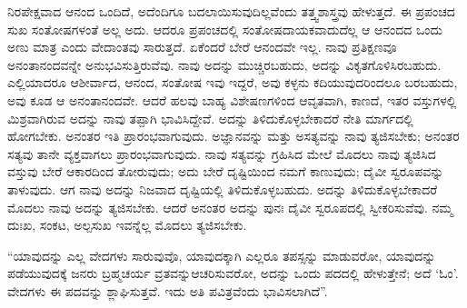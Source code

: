 \vskip 0.2cm 

ನಿರಪೇಕ್ಷವಾದ ಆನಂದ ಒಂದಿದೆ, ಅದೆಂದಿಗೂ ಬದಲಾಯಿಸುವುದಿಲ್ಲವೆಂದು ತತ್ತ್ವಶಾಸ್ತ್ರವು ಹೇಳುತ್ತದೆ. ಈ ಪ್ರಪಂಚದ ಸುಖ ಸಂತೋಷಗಳಂತೆ ಅಲ್ಲ ಅದು. ಆದರೂ ಪ್ರಪಂಚದಲ್ಲಿ ಸಂತೋಷದಾಯಕವಾದುದೆಲ್ಲ ಆ ಆನಂದದ ಒಂದು ಅಣು ಮಾತ್ರ ಎಂದು ವೇದಾಂತವು ಸಾರುತ್ತದೆ. ಏಕೆಂದರೆ ಬೇರೆ ಆನಂದವೇ ಇಲ್ಲ. ನಾವು ಪ್ರತಿಕ್ಷಣವೂ ಅನಂತಾನಂದವನ್ನೇ ಅನುಭವಿಸುತ್ತಿರುವೆವು. ನಾವು ಅದನ್ನು ಮುಚ್ಚಿರಬಹುದು, ಅದನ್ನು ವಿಕೃತಗೊಳಿಸಿರಬಹುದು. ಎಲ್ಲಿಯಾದರೂ ಆಶೀರ್ವಾದ, ಆನಂದ, ಸಂತೋಷ ಇವು ಇದ್ದರೆ, ಅವು ಕಳ್ಳನು ಕದಿಯುವುದರಿಂದಲೂ ಬರಬಹುದು, ಅವು ಕೂಡ ಆ ಅನಂತಾನಂದವೇ. ಆದರೆ ಹಲವು ಬಾಹ್ಯ ವಿಶೇಷಣಗಳಿಂದ ಆವೃತವಾಗಿ, ಕಾಣದೆ, ಇತರ ವಸ್ತುಗಳಲ್ಲಿ ಮಿಶ್ರವಾಗಿರುವ ಅದನ್ನು ನಾವು ತಪ್ಪಾಗಿ ಭಾವಿಸಿದ್ದೇವೆ. ಅದನ್ನು ತಿಳಿದುಕೊಳ್ಳಬೇಕಾದರೆ ನೇತಿ ಮಾರ್ಗದಲ್ಲಿ ಹೋಗಬೇಕು. ಅನಂತರ ಇತಿ ಪ್ರಾರಂಭವಾಗುವುದು. ಅಜ್ಞಾನವನ್ನು ಮತ್ತು ಅಸತ್ಯವನ್ನು ನಾವು ತ್ಯಜಿಸಬೇಕು; ಅನಂತರ ಸತ್ಯವು ತಾನೇ ವ್ಯಕ್ತವಾಗಲು ಪ್ರಾರಂಭವಾಗುವುದು. ನಾವು ಸತ್ಯವನ್ನು ಗ್ರಹಿಸಿದ ಮೇಲೆ ಮೊದಲು ನಾವು ತ್ಯಜಿಸಿದ ವಸ್ತುವು ಬೇರೆ ಆಕಾರದಿಂದ ತೋರುವುದು; ಅದು ಬೇರೆ ದೃಷ್ಟಿಯಿಂದ ನಮಗೆ ಕಾಣುವುದು; ದೈವೀ ಸ್ವರೂಪವನ್ನು ತಾಳುವುದು. ಆಗ ನಾವು ಅದನ್ನು ನಿಜವಾದ ದೃಷ್ಟಿಯಲ್ಲಿ ತಿಳಿದುಕೊಳ್ಳಬಹುದು. ಅದನ್ನು ತಿಳಿದುಕೊಳ್ಳಬೇಕಾದರೆ ಮೊದಲು ನಾವು ಅದನ್ನು ತ್ಯಜಿಸಬೇಕು. ಆದರೆ ಅನಂತರ ಅದನ್ನು ಪುನಃ ದೈವೀ ಸ್ವರೂಪದಲ್ಲಿ ಸ್ವೀಕರಿಸುವೆವು. ನಮ್ಮ ದುಃಖ, ಸಂಕಟ, ಅಲ್ಪಸುಖ ಇವನ್ನೆಲ್ಲ ಮೊದಲು ತ್ಯಜಿಸಬೇಕು.

\vskip 0.2cm 

“ಯಾವುದನ್ನು ಎಲ್ಲ ವೇದಗಳು ಸಾರುವುವೊ, ಯಾವುದಕ್ಕಾಗಿ ಎಲ್ಲರೂ ತಪಸ್ಸನ್ನು ಮಾಡುವರೋ, ಯಾವುದನ್ನು ಪಡೆಯುವುದಕ್ಕೆ ಜನರು ಬ್ರಹ್ಮಚರ್ಯ ವ್ರತವನ್ನು\break ಆಚರಿಸುವರೋ, ಅದನ್ನು ಒಂದು ಪದದಲ್ಲಿ ಹೇಳುತ್ತೇನೆ; ಅದೆ ‘ಓಂ’. ವೇದಗಳು ಈ ಪದವನ್ನು ಶ್ಲಾಘಿಸುತ್ತವೆ. ಇದು ಅತಿ ಪವಿತ್ರವೆಂದು ಭಾವಿಸಲಾಗಿದೆ”.

\vskip 0.2cm 

